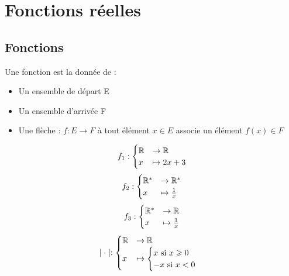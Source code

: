\chapter{Fonctions réelles}
\section{Fonctions}

\begin{graybox}
	\begin{definition}[Fonction]
		Une fonction est la donnée de :
		\begin{itemize}
			\item Un ensemble de départ E
			\item Un ensemble d'arrivée F
			\item Une flèche : $f : E \to F$ à tout élément $x \in E$ associe un élément $f(x) \in F$
		\end{itemize}
	\end{definition}
\end{graybox}

\begin{exemple}
	\begin{align*}
		f_1 : 
		\begin{cases}
			\mathbb{R} &\to \mathbb{R} \\
			x &\mapsto 2x + 3
		\end{cases}
	\end{align*}
	\begin{align*}
		f_2 : 
		\begin{cases}
			\mathbb{R}^{*} &\to \mathbb{R}^{*} \\
			x &\mapsto \frac{1}{x}
		\end{cases}
	\end{align*}
	\begin{align*}
		f_3 : 
		\begin{cases}
			\mathbb{R}^{*} &\to \mathbb{R} \\
			x &\mapsto \frac{1}{x}
		\end{cases}
	\end{align*}
	\begin{align*}
		\mid \cdot \mid : 
		\begin{cases}
			\mathbb{R} &\to \mathbb{R} \\
			x &\mapsto 
			\begin{cases}
				x \textnormal{ si } x \geqslant 0 \\
				-x \textnormal{ si } x < 0
			\end{cases}
		\end{cases}
	\end{align*}
\end{exemple}

